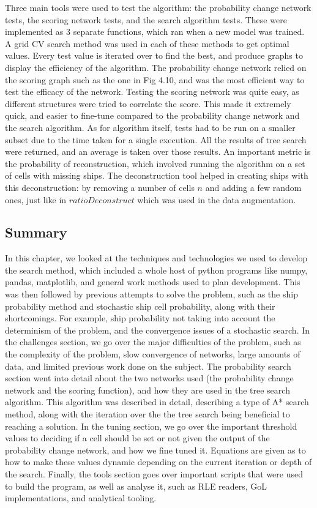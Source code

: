 \documentclass{l4proj}
\begin{document}
Three main tools were used to test the algorithm: the probability change network tests, the scoring network tests, and the search algorithm tests. These were implemented as 3 separate functions, which ran when a new model was trained. A grid CV search method was used in each of these methods to get optimal values. Every test value is iterated over to find the best, and produce graphs to display the efficiency of the algorithm. The probability change network relied on the scoring graph such as the one in Fig 4.10, and was the most efficient way to test the efficacy of the network. Testing the scoring network was quite easy, as different structures were tried to correlate the score. This made it extremely quick, and easier to fine-tune compared to the probability change network and the search algorithm. As for algorithm itself, tests had to be run on a smaller subset due to the time taken for a single execution. All the results of tree search were returned, and an average is taken over those results. An important metric is the probability of reconstruction, which involved running the algorithm on a set of cells with missing ships. The deconstruction tool helped in creating ships with this deconstruction: by removing a number of cells $n$ and adding a few random ones, just like in $ratioDeconstruct$ which was used in the data augmentation.


\subsection{Summary}

In this chapter, we looked at the techniques and technologies we used to develop the search method, which included a whole host of python programs like numpy, pandas, matplotlib, and general work methods used to plan development. This was then followed by previous attempts to solve the problem, such as the ship probability method and stochastic ship cell probability, along with their shortcomings. For example, ship probability not taking into account the determinism of the problem, and the convergence issues of a stochastic search. In the challenges section, we go over the major difficulties of the problem, such as the complexity of the problem, slow convergence of networks, large amounts of data, and limited previous work done on the subject. The probability search section went into detail about the two networks used (the probability change network and the scoring function), and how they are used in the tree search algorithm. This algorithm was described in detail, describing a type of A* search method, along with the iteration over the the tree search being beneficial to reaching a solution. In the tuning section, we go over the important threshold values to deciding if a cell should be set or not given the output of the probability change network, and how we fine tuned it. Equations are given as to how to make these values dynamic depending on the current iteration or depth of the search. Finally, the tools section goes over important scripts that were used to build the program, as well as analyse it, such as RLE readers, GoL implementations, and analytical tooling.
\end{document}
